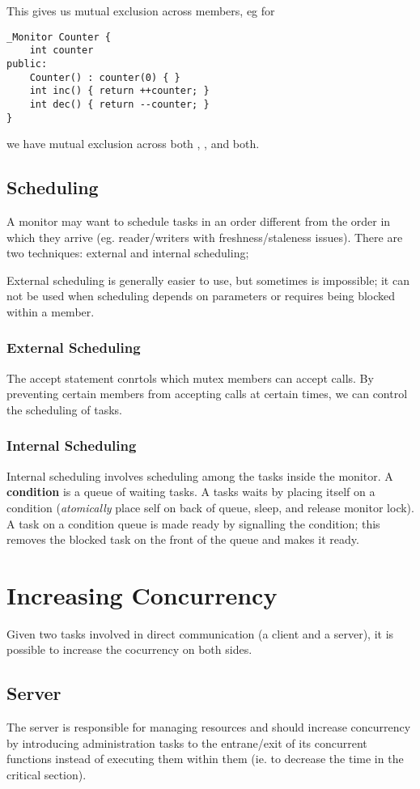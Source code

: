\documentclass[12pt]{article}
\begin{document}
This gives us mutual exclusion across members, eg for
\begin{verbatim}
_Monitor Counter {
    int counter
public:
    Counter() : counter(0) { }
    int inc() { return ++counter; }
    int dec() { return --counter; }
}
\end{verbatim}
we have mutual exclusion across both , , and both.

\subsection{Scheduling}
A monitor may want to schedule tasks in an order different from the order in which they arrive (eg. reader/writers with freshness/staleness issues). There are two techniques: external and internal scheduling;

External scheduling is generally easier to use, but sometimes is impossible; it can not be used when scheduling depends on parameters or requires being blocked within a member.

\subsubsection{External Scheduling}
The accept statement conrtols which mutex members can accept calls. By preventing certain members from accepting calls at certain times, we can control the scheduling of tasks.

\subsubsection{Internal Scheduling}
Internal scheduling involves scheduling among the tasks inside the monitor. A {\bf condition} is a queue of waiting tasks. A tasks waits by placing itself on a condition (\textit{atomically} place self on back of queue, sleep, and release monitor lock). A task on a condition queue is made ready by signalling the condition; this removes the blocked task on the front of the queue and makes it ready.

\section{Increasing Concurrency}
Given two tasks involved in direct communication (a client and a server), it is possible to increase the cocurrency on both sides.

\subsection{Server}
The server is responsible for managing resources and should increase concurrency by introducing administration tasks to the entrane/exit of its concurrent functions instead of executing them within them (ie. to decrease the time in the critical section).
\end{document}
